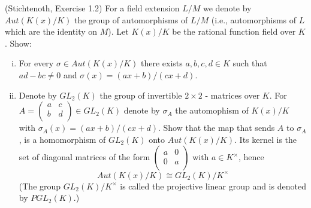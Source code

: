 
\begin{exercise}(Stichtenoth, Exercise 1.2) \label{GLP2}
For a field extension $L/M$ we denote by $Aut(K(x)/K)$ the group 
of automorphisms of $L/M$ (i.e., automorphisms of $L$ which are 
the identity on $M$). Let $K(x)/K$ be the rational function field 
over $K$. Show:

\begin{enumerate}[(i)]

\item \label{existsabcd} For every $\sigma \in Aut(K(x)/K)$ there 
exists $a,b,c,d \in K$ such that $ad-bc \neq 0$ and $\sigma (x) = (ax+b)/(cx+d)$. 


\item Denote by $GL_2(K)$ the group of invertible $2 \times 2$ 
- matrices over $K$. For $A= 
\begin{pmatrix} a & c \\ b & d \\ \end{pmatrix} \in GL_2(K)$ 
denote by $\sigma_A$ the automophism of $K(x)/K$ with $\sigma_A(x) = (ax+b)/(cx+d) $. 
Show that the map that sends $A$ to $\sigma_A$, is a homomorphism of $GL_2(K) $ 
onto $Aut(K(x)/K)$. Its kernel is the set of diagonal matrices of the 
form $\begin{pmatrix} a & 0 \\ 0 & a \\ \end{pmatrix}$ with $a \in K^{\times}$, 
hence $$Aut(K(x)/K) \cong GL_2(K)/K^{\times}$$ (The group $GL_2(K)/K^{\times}$ 
is called the projective linear group and is denoted by $PGL_2(K)$.)

\end{enumerate}
\end{exercise}

